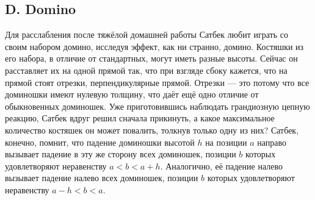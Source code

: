 





\subsection*{D. Domino}

Для расслабления после тяжёлой домашней работы Сатбек любит играть со своим набором домино, исследуя эффект, как ни странно, домино. Костяшки из его набора, в отличие от стандартных, могут иметь разные высоты. Сейчас он расставляет их на одной прямой так, что при взгляде сбоку кажется, что на прямой стоят отрезки, перпендикулярные прямой. Отрезки --- это потому что все доминошки имеют нулевую толщину, что даёт ещё одно отличие от обыкновенных доминошек. Уже приготовившись наблюдать грандиозную цепную реакцию, Сатбек вдруг решил сначала прикинуть, а какое максимальное количество костяшек он может повалить, толкнув только одну из них? Сатбек, конечно, помнит, что падение доминошки высотой $h$ на позиции $a$ направо вызывает падение в эту же сторону всех доминошек, позиции $b$ которых удовлетворяют неравенству $a < b < a + h$. Аналогично, её падение налево вызывает падение налево всех доминошек, позиции $b$ которых удовлетворяют неравенству $a - h < b < a$.




